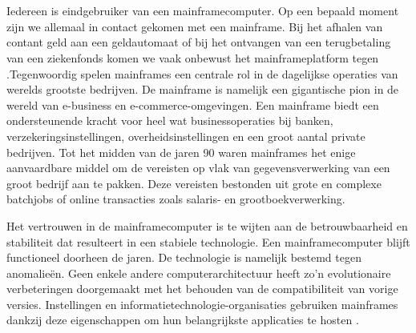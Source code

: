 \section{}

Iedereen is eindgebruiker van een mainframecomputer. Op een bepaald moment zijn we allemaal in contact gekomen met een mainframe. Bij het afhalen van contant geld aan een geldautomaat of bij het ontvangen van een terugbetaling van een ziekenfonds komen we vaak onbewust het mainframeplatform tegen \autocite{Ebbers2022}.Tegenwoordig spelen mainframes een centrale rol in de dagelijkse operaties van werelds grootste bedrijven. De mainframe is namelijk een gigantische pion in de wereld van e-business en e-commerce-omgevingen. Een mainframe biedt een ondersteunende kracht voor heel wat businessoperaties bij banken, verzekeringsinstellingen, overheidsinstellingen en een groot aantal private bedrijven. Tot het midden van de jaren 90 waren mainframes het enige aanvaardbare middel om de vereisten op vlak van gegevensverwerking van een groot bedrijf aan te pakken. Deze vereisten bestonden uit grote en complexe batchjobs of online transacties zoals salaris- en grootboekverwerking.

Het vertrouwen in de mainframecomputer is te wijten aan de betrouwbaarheid en stabiliteit dat resulteert in een stabiele technologie. Een mainframecomputer blijft functioneel doorheen de jaren. De technologie is namelijk bestemd tegen anomalieën. Geen enkele andere computerarchitectuur heeft zo'n evolutionaire verbeteringen doorgemaakt met het behouden van de compatibiliteit van vorige versies. Instellingen en informatietechnologie-organisaties gebruiken mainframes dankzij deze eigenschappen om hun belangrijkste applicaties te hosten \autocite{Ebbers2022}. 

\newpage 

\section{}
\label{sec:probleemstelling}

